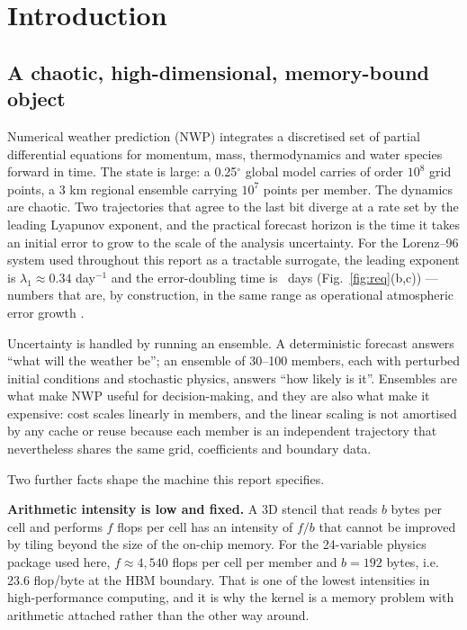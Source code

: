 \section{Introduction}\label{sec:intro}

\subsection{A chaotic, high-dimensional, memory-bound object}
Numerical weather prediction (NWP) integrates a discretised set of partial differential equations
for momentum, mass, thermodynamics and water species forward in time. The state is large: a
0.25$^\circ$ global model carries of order $10^{8}$ grid points, a 3 km regional ensemble carrying
$10^{7}$ points per member. The dynamics are chaotic. Two trajectories that agree to the last bit
diverge at a rate set by the leading Lyapunov exponent, and the practical forecast horizon is the
time it takes an initial error to grow to the scale of the analysis uncertainty. For the
Lorenz--96 system used throughout this report as a tractable surrogate, the leading exponent is
$\lambda_1 \approx 0.34$ day$^{-1}$ and the error-doubling time is \ACDoubling\ days
(Fig.~\ref{fig:req}(b,c)) --- numbers that are, by construction, in the same range as operational
atmospheric error growth \cite{lorenz1963,lorenz1996,kalnay2003}.

Uncertainty is handled by running an ensemble. A deterministic forecast answers ``what will the
weather be''; an ensemble of 30--100 members, each with perturbed initial conditions and
stochastic physics, answers ``how likely is it''. Ensembles are what make NWP useful for
decision-making, and they are also what make it expensive: cost scales linearly in members, and
the linear scaling is not amortised by any cache or reuse because each member is an independent
trajectory that nevertheless shares the same grid, coefficients and boundary data.

Two further facts shape the machine this report specifies.

\textbf{Arithmetic intensity is low and fixed.} A 3D stencil that reads $b$ bytes per cell and
performs $f$ flops per cell has an intensity of $f/b$ that cannot be improved by tiling beyond the
size of the on-chip memory. For the 24-variable physics package used here, $f \approx 4{,}540$
flops per cell per member and $b = 192$ bytes, i.e. 23.6 flop/byte at the HBM boundary. That is
one of the lowest intensities in high-performance computing, and it is why the kernel is a memory
problem with arithmetic attached rather than the other way around.

